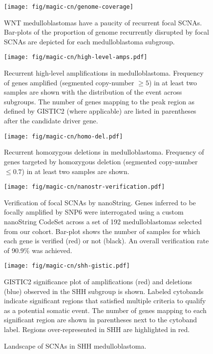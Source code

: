 \documentclass[11pt,letterpaper]{article}
\theoremstyle{definition}
\begin{document}
\begin{SCfigure}
	\centering
	\texttt{[image: fig/magic-cn/genome-coverage]}
	\caption{WNT medulloblastomas have a paucity of recurrent focal SCNAs. Bar-plots of the proportion of genome recurrently disrupted by focal SCNAs are depicted for each medulloblastoma subgroup.}
	\label{fig:genome-coverage}
\end{SCfigure}

\begin{SCfigure}
	\centering
	\texttt{[image: fig/magic-cn/high-level-amps.pdf]}
	\caption{Recurrent high-level amplifications in medulloblastoma.
	Frequency of genes amplified (segmented copy-number $\geq 5$) in at least two samples are shown with the distribution of the event across subgroups. The number of genes mapping to the peak region as defined by GISTIC2 (where applicable) are listed in parentheses after the candidate driver gene.}
	\label{fig:high-level-amps}
\end{SCfigure}

\begin{SCfigure}
	\centering
	\texttt{[image: fig/magic-cn/homo-del.pdf]}
	\caption{Recurrent homozygous deletions in medulloblastoma. Frequency of genes targeted by homozygous deletion (segmented copy-number $\leq 0.7$) in at least two samples are shown.}
	\label{fig:homo-del}
\end{SCfigure}

\begin{SCfigure}
	\centering
	\texttt{[image: fig/magic-cn/nanostr-verification.pdf]}
	\caption{Verification of focal SCNAs by nanoString.
	Genes inferred to be focally amplified by SNP6 were interrogated using a custom nanoString CodeSet across a set of 192 medulloblastomas selected from our cohort. Bar-plot shows the number of samples for which each gene is verified (red) or not (black). An overall verification rate of 90.9\% was achieved.}
	\label{fig:nanostr-verification}
\end{SCfigure}

\clearpage

\begin{figure}[h]
	\begin{center}
		\texttt{[image: fig/magic-cn/shh-gistic.pdf]}
	\end{center}
	\caption{Landscape of SCNAs in SHH medulloblastoma.}
	GISTIC2 significance plot of amplifications (red) and deletions (blue) observed in the SHH subgroup is shown.
	Labeled cytobands indicate significant regions that satisfied multiple criteria to qualify as a potential somatic event. The number of genes mapping to each significant region are shown in parentheses next to the cytoband label.  Regions over-represented in SHH are highlighted in red.
	\label{fig:shh-gistic}
\end{figure}
\end{document}
